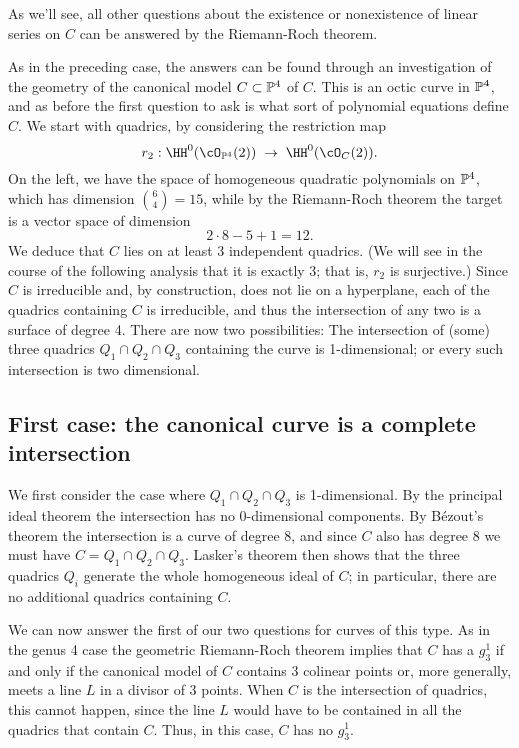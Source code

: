 As we'll see, all other questions about the existence or nonexistence of linear series on $C$ can be answered by the Riemann-Roch theorem.

As in the preceding case, the answers can be found through an investigation of the geometry of the canonical model $C \subset \PP^4$ of $C$. This is an octic curve in $\PP^4$, and as before the first question to ask is what sort of polynomial equations define $C$. We start with quadrics, by considering the restriction map
$$
r_2 : \HH^0(\cO_{\PP^4}(2)) \; \to \; \HH^0(\cO_{C}(2)).
$$
On the left, we have the space of homogeneous quadratic polynomials on $\PP^4$, which has dimension $\binom{6}{4} = 15$, while by the Riemann-Roch theorem the target is a vector space of dimension
$$
2\cdot8 - 5 + 1 = 12.
$$
We deduce that $C$ lies on at least 3 independent quadrics. (We will see in the course of the following analysis that it is exactly 3; that is, $r_2$ is surjective.) Since $C$ is irreducible and, by construction, does not lie on a hyperplane, each of the quadrics containing $C$ is irreducible, and thus the intersection of any two is a surface of degree 4. There are now two possibilities:  The intersection of (some) three quadrics $Q_1 \cap Q_2 \cap Q_3$ containing the curve is 1-dimensional; or every such intersection is two dimensional. 

\subsection{First case: the canonical curve is a complete intersection}

We first consider the case where $Q_1 \cap Q_2 \cap Q_3$ is 1-dimensional. By the principal ideal theorem the intersection has no 0-dimensional components. By B\'ezout's theorem the intersection is a curve of degree 8, and since $C$ also has degree 8 we must have $C=Q_1 \cap Q_2 \cap Q_3$. Lasker's theorem then shows that the three quadrics $Q_i$ generate the whole homogeneous ideal of $C$; in particular, there are no additional quadrics containing $C$.

We can now answer the first of our two questions for curves of this type. As in the genus 4 case the geometric Riemann-Roch theorem implies that $C$ has a $g^1_3$ if and only if the canonical model of $C$ contains 3 colinear points or, more generally, meets a line $L$ in a divisor of 3 points. When $C$ is the intersection of quadrics, this cannot happen, since the line $L$ would have to be contained in all the quadrics that contain $C$. Thus, in this case, 
$C$ has no $g^1_3$.


